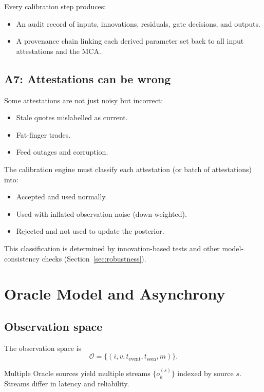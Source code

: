 \documentclass[11pt,a4paper]{article}
\begin{document}
Every calibration step produces:
\begin{itemize}
    \item An audit record of inputs, innovations, residuals, gate decisions, and outputs.
    \item A provenance chain linking each derived parameter set back to all input attestations and the MCA.
\end{itemize}

\subsection{A7: Attestations can be wrong}

Some attestations are not just noisy but incorrect:
\begin{itemize}
    \item Stale quotes mislabelled as current.
    \item Fat-finger trades.
    \item Feed outages and corruption.
\end{itemize}

The calibration engine must classify each attestation (or batch of attestations) into:
\begin{itemize}
    \item Accepted and used normally.
    \item Used with inflated observation noise (down-weighted).
    \item Rejected and not used to update the posterior.
\end{itemize}

This classification is determined by innovation-based tests and other model-consistency checks (Section~\ref{sec:robustness}).

\section{Oracle Model and Asynchrony}

\subsection{Observation space}

The observation space is
\[
    \mathcal{O} = \{(i, v, t_{\text{event}}, t_{\text{seen}}, m)\}.
\]

Multiple Oracle sources yield multiple streams $\{o_k^{(s)}\}$ indexed by source $s$. Streams differ in latency and reliability.
\end{document}
